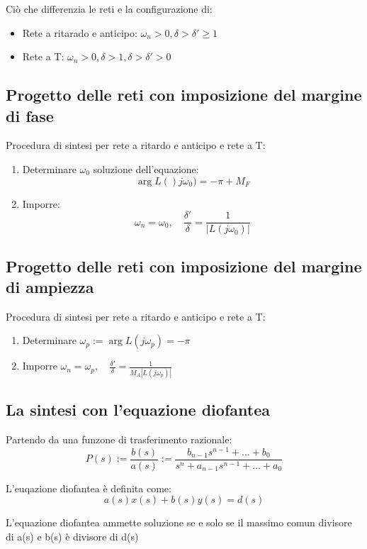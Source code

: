 Ciò che differenzia le reti e la configurazione di:
\begin{itemize}
  \item Rete a ritarado e anticipo: $\omega_n > 0, \delta > \delta' \geq 1$
  \item Rete a T: $\omega_n > 0, \delta > 1, \delta > \delta' > 0$
\end{itemize}


\subsection{Progetto delle reti con imposizione del margine di fase}

Procedura di sintesi per rete a ritardo e anticipo e rete a T:
\begin{enumerate}
  \item Determinare $\omega_0$ soluzione dell'equazione:
    \begin{equation}
      \arg L()j\omega_0) = -\pi + M_F
    \end{equation}

  \item Imporre:
    \begin{equation}
      \omega_n = \omega_0, \quad \frac{\delta'}{\delta} = \frac{1}{|L(j\omega_0)|}
    \end{equation}
\end{enumerate}

\subsection{Progetto delle reti con imposizione del margine di ampiezza}
Procedura di sintesi per rete a ritardo e anticipo e rete a T:
\begin{enumerate}
  \item Determinare $\omega_p := \arg L(j\omega_p) = -\pi$
  \item Imporre $\omega_n = \omega_p, \quad \frac{\delta'}{\delta} = \frac{1}{M_A |L(j\omega_p)|}$
\end{enumerate}

\subsection{La sintesi con l'equazione diofantea}
Partendo da una funzone di trasferimento razionale:
\begin{equation}
  P(s) := \frac{b(s)}{a(s)} := \frac{b_{n-1}s^{n-1} + \dots + b_0}{s^n + a_{n-1}s^{n-1} + \dots + a_0}
\end{equation}

L'euqazione diofantea è definita come:
\begin{equation}
  a(s)x(s) + b(s)y(s) = d(s)
\end{equation}

\begin{theorem}
  L’equazione diofantea ammette soluzione se e solo se il 
massimo comun divisore di a(s) e b(s) è divisore di d(s)
\end{theorem}

